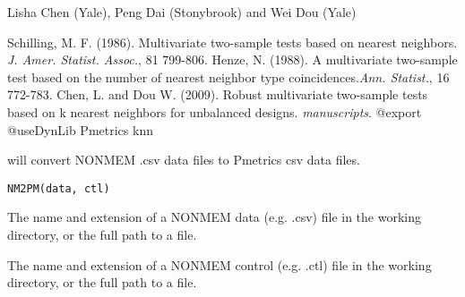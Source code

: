 \documentclass[a4paper]{book}
\begin{document}
%
\begin{Author}\relax
Lisha Chen (Yale), Peng Dai (Stonybrook) and Wei Dou (Yale)
\end{Author}
%
\begin{References}\relax
Schilling, M. F. (1986). Multivariate two-sample tests based on nearest neighbors. \emph{J. Amer. Statist. Assoc.}, 81 799-806.
Henze, N. (1988). A multivariate two-sample test based on the number of nearest neighbor type coincidences.\emph{Ann. Statist.}, 16 772-783.
Chen, L. and Dou W. (2009). Robust multivariate two-sample tests based on k nearest neighbors for unbalanced designs. \emph{manuscripts}.  
@export
@useDynLib Pmetrics knn
\end{References}
%
\begin{Description}\relax
{} will convert NONMEM .csv data files to Pmetrics csv data files.
\end{Description}
%
\begin{Usage}
\begin{verbatim}
NM2PM(data, ctl)
\end{verbatim}
\end{Usage}
%
\begin{Arguments}
\begin{ldescription}
\item[\code{data}] The name and extension of a NONMEM data (e.g. .csv) file in the working directory, or the full path to a file.

\item[\code{ctl}] The name and extension of a NONMEM control (e.g. .ctl) file in the working directory, or the full path to a file.
\end{ldescription}
\end{Arguments}
%
\end{document}
